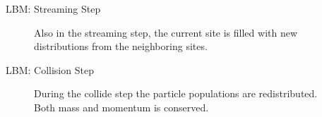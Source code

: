 \documentclass{beamer}
\begin{document}
\begin{frame}{LBM: Streaming Step}
\begin{figure}[!htb]
\centering
\begin{minipage}[t]{.45\textwidth}
	\centering
	\begin{small}
	\def\svgwidth{0.9\linewidth}
	
	\end{small}
	\caption{Lattice streaming step, representing advection in a fluid. All functions $f_i$ are copied to the neighboring $f_i^{temp}$ in parallel.}
	\label{fig:d2q9_3}
\end{minipage}\qquad%
\begin{minipage}[t]{.45\textwidth}
	\centering
	\begin{small}
	\def\svgwidth{0.9\linewidth}
	
	\end{small}
	\caption{Also in the streaming step, the current site is filled with new distributions from the neighboring sites.}
	\label{fig:d2q9_4}
\end{minipage}
\end{figure}
\end{frame}

\begin{frame}{LBM: Collision Step}
\begin{figure}[!htb]
\centering
\begin{minipage}[t]{.45\textwidth}
	\centering
	\begin{footnotesize}
	\def\svgwidth{0.9\linewidth}
	
	\end{footnotesize}
	\caption{Collision step, representing diffusion in a fluid. Particles from adjacent sites collide locally in the current site (see BGK).}
	\label{fig:d2q9_5}
\end{minipage}\qquad%
\begin{minipage}[t]{.45\textwidth}
	\centering
	\begin{small}
	\def\svgwidth{0.9\linewidth}
	
	\end{small}
	\caption{During the collide step the particle populations are redistributed. Both mass and momentum is conserved.}
	\label{fig:d2q9_6}
\end{minipage}
\end{figure}
\end{frame}
\end{document}
